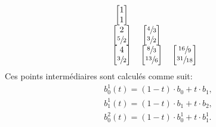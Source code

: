 \begin{equation}
    \begin{tabular}{ccc}
        $\begin{bmatrix}1 \\1\end{bmatrix}$            &                                                            &                                                              \\
        $\begin{bmatrix}2 \\\sfrac{5}{2}\end{bmatrix}$ & $\begin{bmatrix}\sfrac{4}{3} \\\sfrac{3}{2}\end{bmatrix}$  &                                                              \\
        $\begin{bmatrix}4 \\\sfrac{3}{2}\end{bmatrix}$ & $\begin{bmatrix}\sfrac{8}{3} \\\sfrac{13}{6}\end{bmatrix}$ & $\begin{bmatrix}\sfrac{16}{9} \\\sfrac{31}{18}\end{bmatrix}$ \\
    \end{tabular}
    \nonumber
\end{equation}
Ces points intermédiaires sont calculés comme suit:
\begin{equation}
    \begin{aligned}
         & b_0^1(t) = (1-t)\cdot b_0 + t\cdot b_1,     \\
         & b_1^1(t) = (1-t)\cdot b_1 + t\cdot b_2,     \\
         & b_0^2(t) = (1-t)\cdot b_0^1 + t\cdot b_1^1.
    \end{aligned}
    \nonumber
\end{equation}